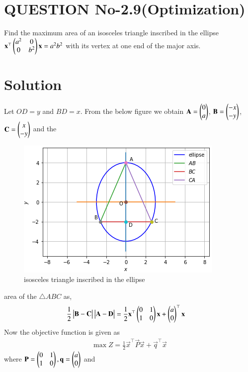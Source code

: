 \documentclass[journal,12pt,twocolumn]{IEEEtran}
\begin{document}
%
\section{QUESTION No-2.9(Optimization)}
Find the maximum area of an isosceles triangle inscribed in the ellipse $\mathbf{x}^{\top}\begin{pmatrix}a^2 & 0 \\ 0 & b^2\end{pmatrix}\mathbf{x} = a^2b^2$
with its vertex at one end of the major axis.
\section{Solution}
Let $OD=y$ and $BD=x$. From the below figure we obtain $\mathbf{A} = \begin{pmatrix}0 \\ a\end{pmatrix}$, $\mathbf{B} = \begin{pmatrix}-x \\ -y\end{pmatrix}$, $\mathbf{C} = \begin{pmatrix}x \\ -y\end{pmatrix}$ and the 
\begin{figure}[!ht]
\centering
\includegraphics[width=\columnwidth]{isosceles.PNG}
\caption{isosceles triangle inscribed in the ellipse}
\label{fig:Graph}	
\end{figure}
area of the $\triangle ABC$ as, 
\begin{align}
    \frac{1}{2}\begin{vmatrix}\mathbf{B}-\mathbf{C}\end{vmatrix}\begin{vmatrix}\mathbf{A}-\mathbf{D}\end{vmatrix} &=\frac{1}{2}\mathbf{x}^{\top}\begin{pmatrix}0&1 \\ 1&0\end{pmatrix}\mathbf{x}+ \begin{pmatrix}a \\ 0\end{pmatrix}^{\top}\mathbf{x}
\end{align}
Now the objective function is given as
\begin{align}
    \max Z = \frac{1}{2}\vec{x}^{\top}\vec{P}\vec{x}+ \vec{q}^{\top}\vec{x}
\end{align}
where $\mathbf{P}=\begin{pmatrix}0&1 \\ 1&0\end{pmatrix} , \mathbf{q}=\begin{pmatrix}a \\ 0\end{pmatrix}$ and
\end{document}
